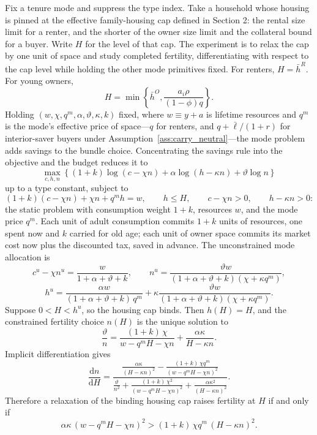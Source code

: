 \documentclass[11pt]{article}
\newcommand{\dd}{\mathrm d}
\newcommand{\1}{\mathbf 1}
\begin{document}
Fix a tenure mode and suppress the type index. Take a household whose housing is pinned at the effective family-housing cap defined in Section 2: the rental size limit for a renter, and the shorter of the owner size limit and the collateral bound for a buyer. Write $H$ for the level of that cap. The experiment is to relax the cap by one unit of space and study completed fertility, differentiating with respect to the cap level while holding the other mode primitives fixed. For renters, $H=\bar h^R$. For young owners,
\[
H=
\min\left\{
\bar h^O,
\frac{a_i\rho}{(1-\phi)q}
\right\}.
\]
Holding $(w,\chi,q^m,\alpha,\vartheta,\kappa,k)$ fixed, where $w\equiv y+a$ is lifetime resources and $q^m$ is the mode's effective price of space---$q$ for renters, and $q+\bar\ell/(1+r)$ for interior-saver buyers under Assumption~\ref{ass:carry_neutral}---the mode problem adds savings to the bundle choice. Concentrating the savings rule into the objective and the budget reduces it to
\[
\max_{c,h,n}
\left\{
(1+k)\log(c-\chi n)+\alpha\log(h-\kappa n)+\vartheta\log n
\right\}
\]
up to a type constant, subject to
\[
(1+k)(c-\chi n)+\chi n+q^m h=w,
\qquad
h\le H,
\qquad
c-\chi n>0,
\qquad
h-\kappa n>0:
\]
the static problem with consumption weight $1+k$, resources $w$, and the mode price $q^m$. Each unit of adult consumption commits $1+k$ units of resources, one spent now and $k$ carried for old age; each unit of owner space commits its market cost now plus the discounted tax, saved in advance.
The unconstrained mode allocation is
\[
c^u-\chi n^u=\frac{w}{1+\alpha+\vartheta+k},
\qquad
n^u=
\frac{\vartheta w}{(1+\alpha+\vartheta+k)(\chi+\kappa q^m)},
\]
\[
h^u=
\frac{\alpha w}{(1+\alpha+\vartheta+k)\,q^m}
+
\kappa
\frac{\vartheta w}{(1+\alpha+\vartheta+k)(\chi+\kappa q^m)}.
\]
Suppose $0<H<h^u$, so the housing cap binds. Then $h(H)=H$, and the constrained fertility choice $n(H)$ is the unique solution to
\[
\frac{\vartheta}{n}
=
\frac{(1+k)\,\chi}{w-q^m H-\chi n}
+
\frac{\alpha\kappa}{H-\kappa n}.
\]
Implicit differentiation gives
\[
\frac{\dd n}{\dd H}
=
\frac{
\frac{\alpha\kappa}{(H-\kappa n)^2}
-
\frac{(1+k)\,\chi q^m}{(w-q^m H-\chi n)^2}
}{
\frac{\vartheta}{n^2}
+
\frac{(1+k)\,\chi^2}{(w-q^m H-\chi n)^2}
+
\frac{\alpha\kappa^2}{(H-\kappa n)^2}
}.
\]
Therefore a relaxation of the binding housing cap raises fertility at $H$ if and only if
\[
\alpha\kappa\,(w-q^m H-\chi n)^2>(1+k)\,\chi q^m\,(H-\kappa n)^2.
\]
\end{document}
